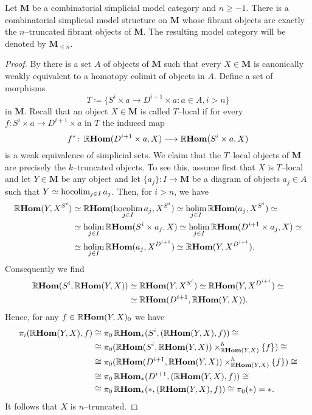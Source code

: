 \begin{theorem}\label{thm:truncated-model-structure-exists}
  Let \(\mathbf{M}\) be a combinatorial simplicial model category and
  \(n\geq -1\). There is a combinatorial simplicial model structure on
  \(\mathbf{M}\) whose fibrant objects are exactly the
  \(n\)--truncated fibrant objects of \(\mathbf{M}\). The resulting
  model category will be denoted by \(\mathbf{M}_{\leq n}\).
\end{theorem}
\begin{proof}
  By \cite[Prop.~4.7]{mr1870516} there is a set \(A\) of objects of
  \(\mathbf{M}\) such that every \(X\in\mathbf{M}\) is canonically
  weakly equivalent to a homotopy colimit of objects in \(A\). Define
  a set of morphisms
  \[
  T \coloneqq \{S^{i}\times a \to D^{i+1}\times a : a\in A, i > n \}
  \]
  in \(\mathbf{M}\). Recall that an object \(X\in\mathbf{M}\) is
  called \(T\)--local if for every \(f\colon S^{i}\times a\to
  D^{i+1}\times a\) in \(T\) the induced map
  \[
  f^{*}\colon \RHom(D^{i+1}\times a, X)\to\RHom(S^{i}\times a, X)
  \]
  is a weak equivalence of simplicial sets. We claim that the
  \(T\)--local objects of \(\mathbf{M}\) are precisely the
  \(k\)--truncated objects. To see this, assume first that \(X\) is
  \(T\)--local and let \(Y\in\mathbf{M}\) be any object and let
  \(\{a_{j}\}\colon I\to\mathbf{M}\) be a diagram of objects
  \(a_{j}\in A\) such that \(Y\simeq \hocolim_{j\in I} a_{j}\). Then,
  for \(i>n\), we have
  \begin{align*}
    \RHom(Y, X^{S^{i}}) &\simeq \RHom(\hocolim_{j\in I}a_{j}, X^{S^{i}})\simeq \holim_{j\in I}\RHom(a_{j}, X^{S^{i}}) \simeq \\
                        &\simeq \holim_{j\in I} \RHom(S^{i}\times a_{j}, X) \simeq \holim_{j\in I}\RHom(D^{i+1}\times a_{j}, X)\simeq \\
                        &\simeq \holim_{j\in I}\RHom(a_{j}, X^{D^{i+1}})\simeq \RHom(Y, X^{D^{i+1}}).
  \end{align*}
  Consequently we find
  \begin{align*}
    \RHom(S^{i}, \RHom(Y, X)) & \simeq \RHom(Y, X^{S^{i}}) \simeq \RHom(Y, X^{D^{i+1}}) \simeq\\
                              &\simeq \RHom(D^{i+1}, \RHom(Y, X)).
  \end{align*}
  Hence, for any \(f\in\RHom(Y,X)_{0}\) we have
  \begin{align*}
    \pi_{i}(\RHom(Y, X), f) &\cong \pi_{0}\RHom_{*}(S^{i}, (\RHom(Y,X), f)) \cong \\
                            &\cong \pi_{0}(\RHom(S^{i}, \RHom(Y,X))\times^{h}_{\RHom(Y,X)}\{f\}) \cong \\
                            &\cong \pi_{0}(\RHom(D^{i+1}, \RHom(Y,X))\times^{h}_{\RHom(Y,X)}\{f\}) \cong \\
                            &\cong \pi_{0}\RHom_{*}(D^{i+1}, (\RHom(Y,X), f)) \cong \\
                            &\cong \pi_{0}\RHom_{*}(*, (\RHom(Y,X), f)) \cong \pi_{0}(*) = *.
  \end{align*}
  It follows that \(X\) is \(n\)--truncated.


\end{proof}
